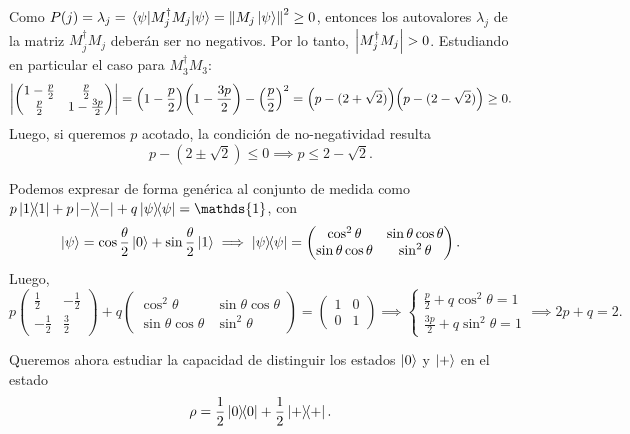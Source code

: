 \documentclass{scrartcl}
\newcommand{\inv}[1]{\frac{1}{#1}}
\DeclareRobustCommand{\[}{\begin{equation}}
\DeclareRobustCommand{\]}{\end{equation}}
\begin{document}
\begin{enumerate}
    Como $P(j) = \lambda_j = \mel{\psi}{M_j^\dagger M_j}{\psi} = \norm{M_j \ket{\psi}}^2 \geq 0$, entonces los autovalores $\lambda_j$ de la matriz $M_j^\dagger M_j$ deberán ser no negativos. Por lo tanto, $\abs{M_j^\dagger M_j} > 0$. Estudiando en particular el caso para $M_3^\dagger M_3$:
    \[
        \abs{
        \begin{pmatrix}
            1-\frac{p}{2} & \frac{p}{2} \\
            \frac{p}{2} & 1-\frac{3p}{2}
        \end{pmatrix}
        } = \qty(1 - \frac{p}{2}) \qty(1 - \frac{3p}{2}) - \qty(\frac{p}{2})^2 = \qty(p - (2 + \sqrt{2})) \qty(p - (2 - \sqrt{2})) \geq 0.
    \]
    Luego, si queremos $p$ acotado, la condición de no-negatividad resulta
    \[ p - (2 \pm \sqrt{2}) \leq 0 \implies p \leq 2 - \sqrt{2}. \]
    
    Podemos expresar de forma genérica al conjunto de medida como $p \dyad{1}{1} + p \dyad{-}{-} + q \dyad{\psi}{\psi} = \mathds{1}$, con
    \[ \ket{\psi} = \cos \frac{\theta}{2} \ket{0} + \sin \frac{\theta}{2} \ket{1} \implies \dyad{\psi}{\psi} = 
    \begin{pmatrix}
        \cos^2\theta & \sin\theta \cos\theta \\
        \sin\theta \cos\theta & \sin^2\theta
    \end{pmatrix}.
    \]
    Luego,
    \[
    p
    \begin{pmatrix}
        \inv{2} & -\inv{2} \\
        -\inv{2} & \frac{3}{2}
    \end{pmatrix}
    + q
    \begin{pmatrix}
        \cos^2\theta & \sin\theta \cos\theta \\
        \sin\theta \cos\theta & \sin^2\theta
    \end{pmatrix}
    =
    \begin{pmatrix}
        1 & 0 \\
        0 & 1
    \end{pmatrix}
    \implies
    \begin{cases}
        \frac{p}{2} + q \cos^2\theta = 1 \\
        \frac{3p}{2} + q \sin^2\theta = 1
    \end{cases}
    \implies 2p + q = 2.
    \]
    
    Queremos ahora estudiar la capacidad de distinguir los estados $\ket{0}$ y $\ket{+}$ en el estado
    \[ \rho = \inv{2} \dyad{0}{0} + \inv{2} \dyad{+}{+}. \]
    

\end{enumerate}
\end{document}
